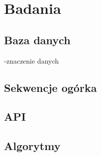 \chapter{Badania}

\section{Baza danych}
-znaczenie danych

\section{Sekwencje ogórka}

\section{API}

\section{Algorytmy}